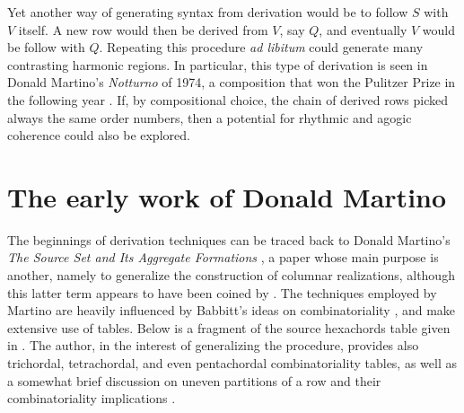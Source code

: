 Yet another way of generating syntax from derivation would be to follow $S$ with $V$ itself. A new row would then be derived from $V$, say $Q$, and eventually $V$ would be follow with $Q$. Repeating this procedure \emph{ad libitum} could generate many contrasting harmonic regions. In particular, this type of derivation is seen in Donald Martino's \emph{Notturno} of 1974, a composition that won the Pulitzer Prize in the following year \cite[181]{Starr1984}. If, by compositional choice, the chain of derived rows picked always the same order numbers, then a potential for rhythmic and agogic coherence could also be explored.


\section{The early work of Donald Martino}

The beginnings of derivation techniques can be traced back to Donald Martino's \emph{The Source Set and Its Aggregate Formations} \cite{Martino1961}, a paper whose main purpose is another, namely to generalize the construction of columnar realizations, although this latter term appears to have been coined by \cite{Starr1984}. The techniques employed by Martino are heavily influenced by Babbitt's ideas on combinatoriality \cite[224]{Martino1961}, and make extensive use of tables. Below is a fragment of the source hexachords table given in \cite[229]{Martino1961}. The author, in the interest of generalizing the procedure, provides also trichordal, tetrachordal, and even pentachordal combinatoriality tables, as well as a somewhat brief discussion on uneven partitions of a row and their combinatoriality implications \cite[267]{Martino1961}.

